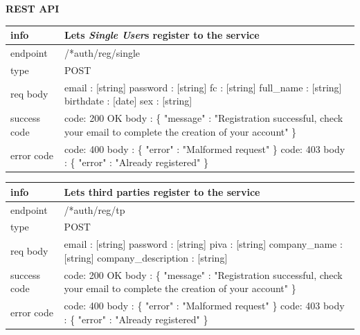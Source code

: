 \documentclass[titlepage]{article}
\begin{document}
	\pagebreak
	
	{\bf REST API}\\ 
	
	\begin{tabularx}{\textwidth}{lX} \hline
		info & Lets {\it Single User}s register to the service \\ \hline
		endpoint & /*auth/reg/single \\ \hline
		type & POST \\ \hline
		req body & 
		email : [string] \newline
		password : [string] \newline
		fc : [string] \newline
		full\_name : [string] \newline
		birthdate : [date] \newline
		sex : [string] \\ \hline
		success code &
		code: 200 OK \newline 
		body : \{ \newline
		"message" : "Registration successful, check your email to complete the creation of your account" \newline
		\} \\ \hline
		error code &
		code: 400 \newline
		body : \{ "error" : "Malformed request" \} \newline \newline
		code: 403 \newline
		body : \{ "error" : "Already registered" \}  \\ \hline
	\end{tabularx}
	
	\vspace{\baselineskip}
	
	\begin{tabularx}{\textwidth}{lX} \hline
		info & Lets third parties register to the service \\ \hline
		endpoint & /*auth/reg/tp \\ \hline
		type & POST \\ \hline
		req body & 
		email : [string] \newline
		password : [string] \newline
		piva : [string] \newline
		company\_name : [string] \newline
		company\_description : [string] \\ \hline
		success code &
		code: 200 OK \newline 
		body : \{ \newline
		"message" : "Registration successful, check your email to complete the creation of your account" \newline
		\} \\ \hline
		error code &
		code: 400 \newline
		body : \{ "error" : "Malformed request" \} \newline \newline
		code: 403 \newline
		body : \{ "error" : "Already registered" \} \\ \hline
	\end{tabularx}
	
\end{document}
